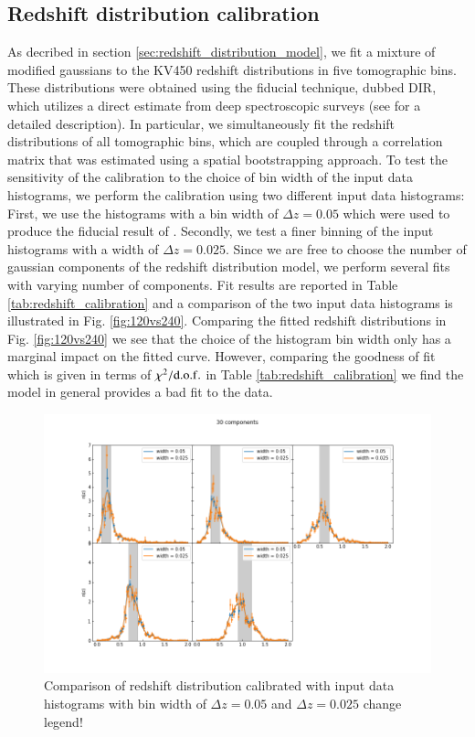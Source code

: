\documentclass{aa}
\begin{document}
\subsection{Redshift distribution calibration}
\label{se:redshift_calibration}
As decribed in section \ref{sec:redshift_distribution_model}, we fit a mixture of modified gaussians to the KV450 redshift distributions in five tomographic bins. These distributions were obtained using the fiducial technique, dubbed DIR, which utilizes a direct estimate from deep spectroscopic surveys (see  for a detailed description). In particular, we simultaneously fit the redshift distributions of all tomographic bins, which are coupled through a correlation matrix that was estimated using a spatial bootstrapping approach. To test the sensitivity of the calibration to the choice of bin width of the input data histograms, we perform the calibration using two different input data histograms: First, we use the histograms with a bin width of $\Delta z = 0.05$ which were used to produce the fiducial result of . Secondly, we test a finer binning of the input histograms with a width of $\Delta z = 0.025$. Since we are free to choose the number of gaussian components of the redshift distribution model, we perform several fits with varying number of components. Fit results are reported in Table \ref{tab:redshift_calibration} and a comparison of the two input data histograms is illustrated in Fig. \ref{fig:120vs240}. Comparing the fitted redshift distributions in Fig. \ref{fig:120vs240} we see that the choice of the histogram bin width only has a marginal impact on the fitted curve. However, comparing the goodness of fit which is given in terms of $\chi^2/{\rm d.o.f.}$ in Table \ref{tab:redshift_calibration} we find the model in general provides a bad fit to the data. 
\begin{figure}
\label{fig:120vs240}
\centering
\includegraphics[scale=0.3]{plots/30.png}
\caption{Comparison of redshift distribution calibrated with input data histograms with bin width of $\Delta z = 0.05$ and $\Delta z = 0.025$ {\color{red} change legend!}}
\label{fig:comb}
\end{figure}
\end{document}
